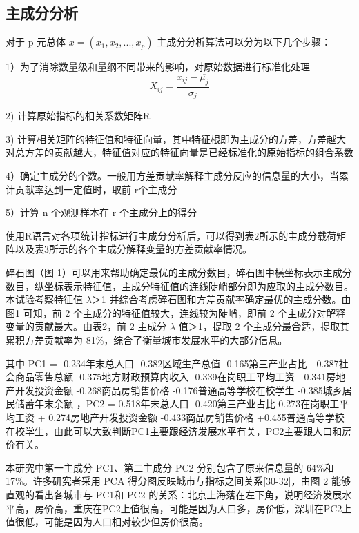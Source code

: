 \documentclass [a4paper]{article}
\begin{document}
    \subsection{主成分分析}
    	对于 p 元总体 $ x=(x_1,x_2,...,x_p)$ 主成分分析算法可以分为以下几个步骤：

      1）为了消除数量级和量纲不同带来的影响，对原始数据进行标准化处理
      $$X_{ij} = \frac{x_{ij}-\overline{\mu_j}}{\sigma_j}$$

	2) 计算原始指标的相关系数矩阵R

	3) 计算相关矩阵的特征值和特征向量，其中特征根即为主成分的方差，方差越大对总方差的贡献越大，特征值对应的特征向量是已经标准化的原始指标的组合系数

	4）确定主成分的个数。一般用方差贡献率解释主成分反应的信息量的大小，当累计贡献率达到一定值时，取前 r个主成分

	5）计算 n 个观测样本在 r 个主成分上的得分

  使用R语言对各项统计指标进行主成分分析后，可以得到表2所示的主成分载荷矩阵以及表3所示的各个主成分解释变量的方差贡献率情况。

  碎石图（图 1）可以用来帮助确定最优的主成分数目，碎石图中横坐标表示主成分数目，纵坐标表示特征值，主成分特征值的连线陡峭部分即为应取的主成分数目。本试验考察特征值 $\lambda$＞1 并综合考虑碎石图和方差贡献率确定最优的主成分数。由图1 可知，前 2 个主成分的特征值较大，连线较为陡峭，即前 2 个主成分对解释变量的贡献最大。由表2，前 2 主成分 $\lambda$ 值＞1，提取 2 个主成分最合适，提取其累积方差贡献率为 81\%，综合了衡量城市发展水平的大部分信息。

  其中 PC1 = -0.234年末总人口 -0.382区域生产总值 -0.165第三产业占比 - 0.387社会商品零售总额 -0.375地方财政预算内收入 -0.339在岗职工平均工资 - 0.341房地产开发投资金额 -0.268商品房销售价格 -0.176普通高等学校在校学生 -0.385城乡居民储蓄年末余额 ，PC2 = 0.518年末总人口 -0.420第三产业占比-0.273在岗职工平均工资 + 0.274房地产开发投资金额 -0.433商品房销售价格 +0.455普通高等学校在校学生，由此可以大致判断PC1主要跟经济发展水平有关，PC2主要跟人口和房价有关。

  本研究中第一主成分 PC1、第二主成分 PC2 分别包含了原来信息量的 64\%和 17\%。许多研究者采用 PCA 得分图反映城市与指标之间关系[30-32]，由图 2 能够直观的看出各城市与 PC1和 PC2 的关系：北京上海落在左下角，说明经济发展水平高，房价高，重庆在PC2上值很高，可能是因为人口多，房价低，深圳在PC2上值很低，可能是因为人口相对较少但房价很高。
\end{document}
